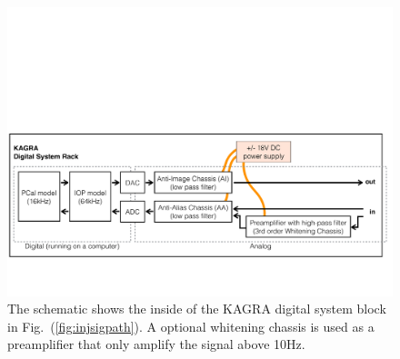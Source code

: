 \begin{figure}[hbt!]
\centering
\includegraphics[width=1\textwidth]{figure/dgs_rack}
\caption[The schematic shows the inside of the KAGRA digital system block in Fig.~(\ref{fig:injsigpath})]{The schematic shows the inside of the KAGRA digital system block in Fig.~(\ref{fig:injsigpath}). A optional whitening chassis is used as a preamplifier that only amplify the signal above 10Hz.     }
\label{fig:dgs_rack}
\end{figure}


